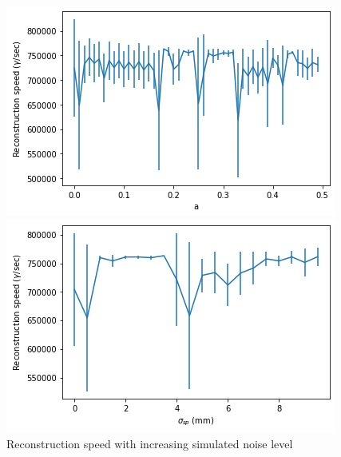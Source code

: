 \begin{figure}
        \centering
        \begin{minipage}{0.49\textwidth} \centering
        \includegraphics[width=\textwidth]{graphs/pi_enNoise_speed.png}
        \end{minipage}
        \begin{minipage}{0.49\textwidth} \centering
        \includegraphics[width=\textwidth]{graphs/pi_spNoise_speed.png}
        \end{minipage}
        \caption{Reconstruction speed with increasing simulated noise level}
        \label{fig:sim_speed}
\end{figure}

